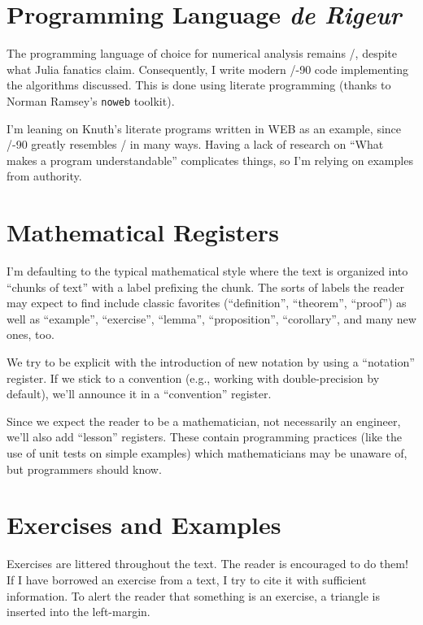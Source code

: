 \section*{Programming Language \textit{de Rigeur}}

The programming language of choice for numerical analysis remains
\FORTRAN/, despite what Julia fanatics claim. Consequently, I write
modern \FORTRAN/-90 code implementing the algorithms discussed. This is
done using literate programming (thanks to Norman Ramsey's {\tt noweb}
toolkit).

I'm leaning on Knuth's literate programs written in WEB as an example,
since \FORTRAN/-90 greatly resembles \PASCAL/ in many ways. Having a
lack of research on ``What makes a program understandable'' complicates
things, so I'm relying on examples from authority.

\section*{Mathematical Registers}

I'm defaulting to the typical mathematical style where the text is
organized into ``chunks of text'' with a label prefixing the chunk. The
sorts of labels the reader may expect to find include classic favorites
(``definition'', ``theorem'', ``proof'') as well as ``example'',
``exercise'', ``lemma'', ``proposition'', ``corollary'', and many new
ones, too.

We try to be explicit with the introduction of new notation by using a
``notation'' register. If we stick to a convention (e.g., working with
double-precision by default), we'll announce it in a ``convention'' register.

Since we expect the reader to be a mathematician, not necessarily an
engineer, we'll also add ``lesson'' registers. These contain programming
practices (like the use of unit tests on simple examples) which
mathematicians may be unaware of, but programmers should know.

\section*{Exercises and Examples}

Exercises are littered throughout the text. The reader is encouraged to
do them! If I have borrowed an exercise from a text, I try to cite it
with sufficient information. To alert the reader that something is an
exercise, a triangle is inserted into the left-margin.

